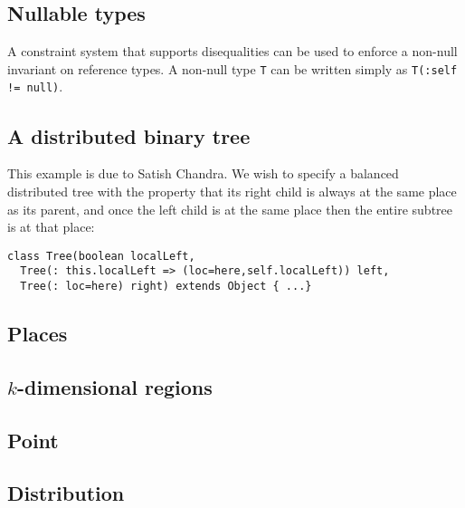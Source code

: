 \subsection{Nullable types}

A constraint system that supports disequalities can be used to
enforce a non-null invariant on reference types.
A non-null type {\tt T} can be written simply as {\tt T(:self != null)}.

\subsection{A distributed binary tree}
This example is due to Satish Chandra. We wish to specify a balanced
distributed tree with the property that its right child is always at
the same place as its parent, and once the left child is at the same
place then the entire subtree is at that place:

{\footnotesize
\begin{verbatim}
class Tree(boolean localLeft,
  Tree(: this.localLeft => (loc=here,self.localLeft)) left, 
  Tree(: loc=here) right) extends Object { ...}
\end{verbatim}}

\subsection{Places}

% 

\subsection{$k$-dimensional regions}

% 

\subsection{Point}


% 

\subsection{Distribution}


